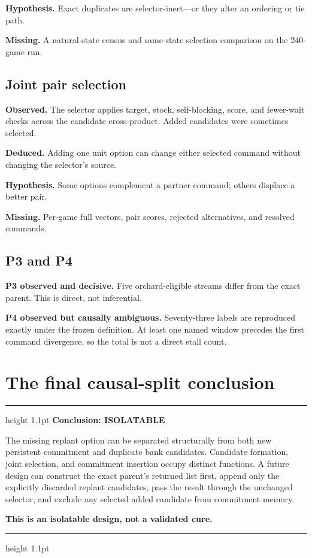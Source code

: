\documentclass[10pt,a4paper]{article}
\newenvironment{GreenBox}
  {\par\medskip\noindent\begin{minipage}{\textwidth}\color{good}\hrule height 1.1pt\vspace{5pt}\color{ink}}
  {\vspace{2pt}\color{good}\hrule height 1.1pt\end{minipage}\par\medskip}
\begin{document}
\textbf{Hypothesis.} Exact duplicates are selector-inert—or they alter an ordering or tie path.

\textbf{Missing.} A natural-state census and same-state selection comparison on the 240-game run.

\subsection{Joint pair selection}

\textbf{Observed.} The selector applies target, stock, self-blocking, score, and fewer-wait checks
across the candidate cross-product. Added candidates were sometimes selected.

\textbf{Deduced.} Adding one unit option can change either selected command without changing the
selector's source.

\textbf{Hypothesis.} Some options complement a partner command; others displace a better pair.

\textbf{Missing.} Per-game full vectors, pair scores, rejected alternatives, and resolved commands.

\subsection{P3 and P4}

\textbf{P3 observed and decisive.} Five orchard-eligible streams differ from the exact parent.
This is direct, not inferential.

\textbf{P4 observed but causally ambiguous.} Seventy-three labels are reproduced exactly under the
frozen definition. At least one named window precedes the first command divergence, so the total is
not a direct stall count.

\section{The final causal-split conclusion}

\begin{GreenBox}
{\large\bfseries\color{good}Conclusion: ISOLATABLE}

The missing replant option can be separated structurally from both new persistent commitment and
duplicate bank candidates. Candidate formation, joint selection, and commitment insertion occupy
distinct functions. A future design can construct the exact parent's returned list first, append
only the explicitly discarded replant candidates, pass the result through the unchanged selector,
and exclude any selected added candidate from commitment memory.

\textbf{This is an isolatable design, not a validated cure.}
\end{GreenBox}
\end{document}
